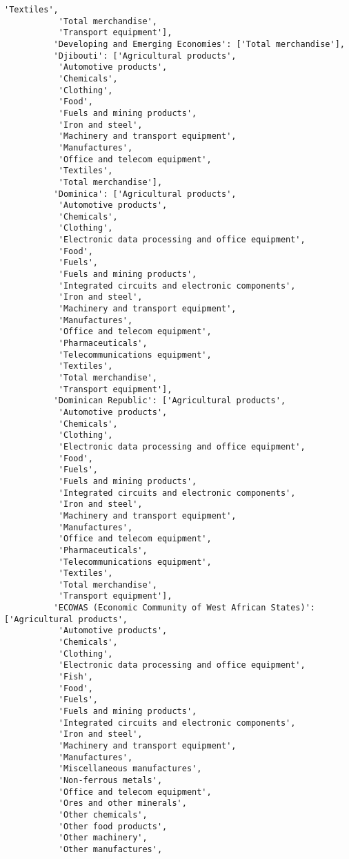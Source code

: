 \documentclass[11pt]{article}
\begin{document}
\begin{Verbatim}[commandchars=\\\{\}]
           'Textiles',
           'Total merchandise',
           'Transport equipment'],
          'Developing and Emerging Economies': ['Total merchandise'],
          'Djibouti': ['Agricultural products',
           'Automotive products',
           'Chemicals',
           'Clothing',
           'Food',
           'Fuels and mining products',
           'Iron and steel',
           'Machinery and transport equipment',
           'Manufactures',
           'Office and telecom equipment',
           'Textiles',
           'Total merchandise'],
          'Dominica': ['Agricultural products',
           'Automotive products',
           'Chemicals',
           'Clothing',
           'Electronic data processing and office equipment',
           'Food',
           'Fuels',
           'Fuels and mining products',
           'Integrated circuits and electronic components',
           'Iron and steel',
           'Machinery and transport equipment',
           'Manufactures',
           'Office and telecom equipment',
           'Pharmaceuticals',
           'Telecommunications equipment',
           'Textiles',
           'Total merchandise',
           'Transport equipment'],
          'Dominican Republic': ['Agricultural products',
           'Automotive products',
           'Chemicals',
           'Clothing',
           'Electronic data processing and office equipment',
           'Food',
           'Fuels',
           'Fuels and mining products',
           'Integrated circuits and electronic components',
           'Iron and steel',
           'Machinery and transport equipment',
           'Manufactures',
           'Office and telecom equipment',
           'Pharmaceuticals',
           'Telecommunications equipment',
           'Textiles',
           'Total merchandise',
           'Transport equipment'],
          'ECOWAS (Economic Community of West African States)': ['Agricultural products',
           'Automotive products',
           'Chemicals',
           'Clothing',
           'Electronic data processing and office equipment',
           'Fish',
           'Food',
           'Fuels',
           'Fuels and mining products',
           'Integrated circuits and electronic components',
           'Iron and steel',
           'Machinery and transport equipment',
           'Manufactures',
           'Miscellaneous manufactures',
           'Non-ferrous metals',
           'Office and telecom equipment',
           'Ores and other minerals',
           'Other chemicals',
           'Other food products',
           'Other machinery',
           'Other manufactures',

\end{Verbatim}
\end{document}

